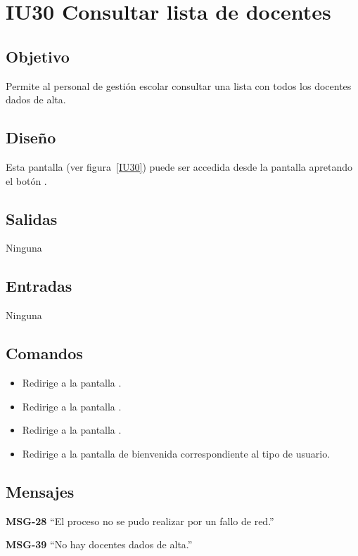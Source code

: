 
\section{IU30 Consultar lista de docentes}
\subsection{Objetivo}
   Permite al personal de gestión escolar consultar una lista con todos los docentes dados de alta.
\subsection{Diseño}
    Esta pantalla  (ver figura~\ref{IU30}) puede ser accedida desde la pantalla  apretando el botón .

\subsection{Salidas}
Ninguna
\subsection{Entradas}
Ninguna
\subsection{Comandos}
\begin{itemize}
    \item {} Redirige a la pantalla .
    \item {} Redirige a la pantalla .
    \item {} Redirige a la pantalla .
    \item {} Redirige a la pantalla de bienvenida correspondiente al tipo de usuario.
    
\end{itemize}

\subsection{Mensajes}

\begin{Citemize}
    \item {\bf MSG-28}  ``El proceso no se pudo realizar por un fallo de red.''
    \item {\bf MSG-39}  ``No hay docentes dados de alta.''
\end{Citemize}


